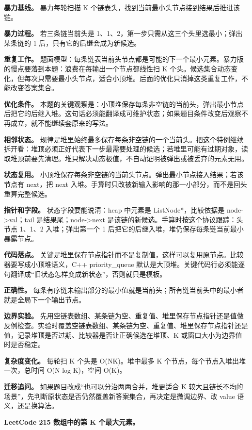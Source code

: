 \textbf{暴力基线。} 暴力每轮扫描 K 个链表头，找到当前最小头节点接到结果后推进该链。

\textbf{暴力过程。} 若三条链当前头是 1、1、2，第一步只需从这三个头里选最小；弹出某条链的 1 后，只有它的后继会成为新候选。

\textbf{重复工作。} 题面模型：每条链表当前头节点都是可能的下一个最小元素。暴力版的慢点要落到本题：浪费在每输出一个节点都线性扫 K 个头。候选集合动态变化，但每次只需要最小头节点，适合小顶堆。后面的优化只消掉这类重复工作，不能改变答案集合。

\textbf{优化条件。} 本题的关键观察是：小顶堆保存每条非空链的当前头，弹出最小节点后把它的后继入堆。这句话必须能翻译成可维护状态；如果题目条件改变后观察不再成立，就不能继续套原来的写法。

\textbf{相邻状态。} 规律是堆里始终最多保存每条非空链的一个当前头。把这个特例继续拆开看：堆顶必须正好代表下一步最需要处理的候选；若堆里可能有过期对象，读取堆顶前要先清理。堆只解决动态极值，不自动证明被弹出或被丢弃的元素无用。

\textbf{状态复用。} 小顶堆保存每条非空链的当前头节点。弹出最小节点接入结果；若该节点有 next，把 next 入堆。手算时只改被新输入影响的那一小部分，而不是回头重算完整候选。

\textbf{指针和字段。} 状态字段要能说清：heap 中元素是 ListNode*，比较依据是 node->val；tail 是结果尾；node->next 是该链的新候选。手算时按这个协议跟踪：头节点 1、1、2 入堆；弹出第一个 1 后把它的后继入堆，堆仍保存每条链当前最小暴露节点。

\textbf{代码落点。} 关键是堆里保存节点指针而不是复制值，这样可以复用原节点。比较器要写成小顶堆语义，C++ priority\_queue 默认是大顶堆。关键代码行必须能逐句翻译成“旧状态怎样变成新状态”，否则就只是模板。

\textbf{正确性。} 每条有序链未输出部分的最小值就是当前头；所有链当前头中的最小者就是全局下一个输出节点。

\textbf{边界实验。} 先用空链表数组、某条链为空、重复值、堆里保存节点指针还是值做反例检查。实验时覆盖空链表数组、某条链为空、重复值、堆里保存节点指针还是值，记录堆顶是否过期、比较器是否让正确候选在堆顶、K 或窗口大小为边界值时是否稳定。

\textbf{复杂度变化。} 每轮扫 K 个头是 O(NK)。堆中最多 K 个节点，每个节点入堆出堆一次，总时间 O(N log K)，空间 O(K)。

\textbf{迁移追问。} 如果题目改成“也可以分治两两合并，堆更适合 K 较大且链长不均的场景”，先判断原状态是否仍然覆盖新答案集合，再决定是微调边界、改 value 语义，还是换算法。

\noindent\textbf{LeetCode 215 数组中的第 K 个最大元素。}

